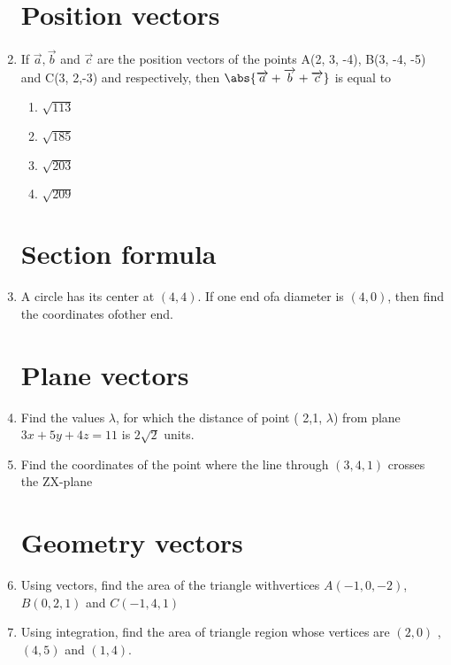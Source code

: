 \begin{enumerate}
\section{Position vectors}
\item If $\overrightarrow{a} , \overrightarrow{b}$ and  $\overrightarrow{c}$ are the position vectors of the points A(2, 3, -4), B(3, -4, -5) and C(3, 2,-3) and respectively, then $\abs{\overrightarrow{a} + \overrightarrow{b} + \overrightarrow{c}}$ is equal to              
\begin{enumerate}                                     
\item $\sqrt{113}$                                     
\item $\sqrt{185}$                                     
\item $\sqrt{203}$                                     
\item $\sqrt{209}$                                    
\end{enumerate}
\section{Section formula}
\item A circle has its center at $(4,4)$. If one end ofa diameter is $(4,0)$, then find the coordinates ofother end.
\section{Plane vectors}
\item Find the values $\lambda$, for which the distance of point ( 2,1, $\lambda$) from plane $3x+5y+4z=11$ is $2\sqrt{2}$ units.                            
\item Find the coordinates of the point where the line through $(3,4,1)$ crosses the ZX-plane
\section{Geometry vectors}
\item Using vectors, find the area of the triangle withvertices $A(-1, 0, -2)$, $B(0, 2, 1)$ and $C(-1, 4,1)$ 
\item Using integration, find the area of triangle region whose vertices are $(2,0)$ , $(4,5)$ and $(1,4)$.

\end{enumerate}
